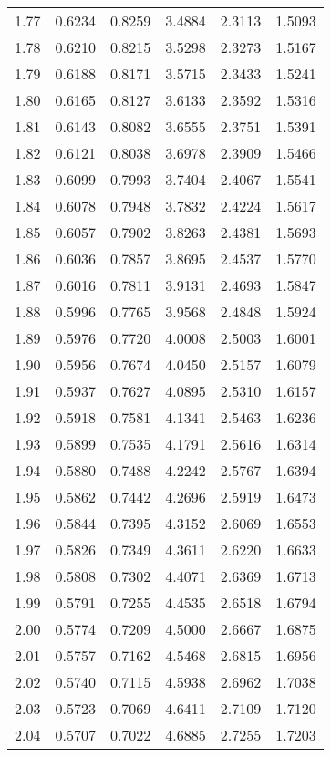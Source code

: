 \documentclass{article}
\begin{document}
\begin{longtable}{cccccc}
1.77 & 0.6234 & 0.8259 & 3.4884 & 2.3113 & 1.5093 \\
1.78 & 0.6210 & 0.8215 & 3.5298 & 2.3273 & 1.5167 \\
1.79 & 0.6188 & 0.8171 & 3.5715 & 2.3433 & 1.5241 \\
1.80 & 0.6165 & 0.8127 & 3.6133 & 2.3592 & 1.5316 \\
1.81 & 0.6143 & 0.8082 & 3.6555 & 2.3751 & 1.5391 \\
1.82 & 0.6121 & 0.8038 & 3.6978 & 2.3909 & 1.5466 \\
1.83 & 0.6099 & 0.7993 & 3.7404 & 2.4067 & 1.5541 \\
1.84 & 0.6078 & 0.7948 & 3.7832 & 2.4224 & 1.5617 \\
1.85 & 0.6057 & 0.7902 & 3.8263 & 2.4381 & 1.5693 \\
1.86 & 0.6036 & 0.7857 & 3.8695 & 2.4537 & 1.5770 \\
1.87 & 0.6016 & 0.7811 & 3.9131 & 2.4693 & 1.5847 \\
1.88 & 0.5996 & 0.7765 & 3.9568 & 2.4848 & 1.5924 \\
1.89 & 0.5976 & 0.7720 & 4.0008 & 2.5003 & 1.6001 \\
1.90 & 0.5956 & 0.7674 & 4.0450 & 2.5157 & 1.6079 \\
1.91 & 0.5937 & 0.7627 & 4.0895 & 2.5310 & 1.6157 \\
1.92 & 0.5918 & 0.7581 & 4.1341 & 2.5463 & 1.6236 \\
1.93 & 0.5899 & 0.7535 & 4.1791 & 2.5616 & 1.6314 \\
1.94 & 0.5880 & 0.7488 & 4.2242 & 2.5767 & 1.6394 \\
1.95 & 0.5862 & 0.7442 & 4.2696 & 2.5919 & 1.6473 \\
1.96 & 0.5844 & 0.7395 & 4.3152 & 2.6069 & 1.6553 \\
1.97 & 0.5826 & 0.7349 & 4.3611 & 2.6220 & 1.6633 \\
1.98 & 0.5808 & 0.7302 & 4.4071 & 2.6369 & 1.6713 \\
1.99 & 0.5791 & 0.7255 & 4.4535 & 2.6518 & 1.6794 \\
2.00 & 0.5774 & 0.7209 & 4.5000 & 2.6667 & 1.6875 \\
2.01 & 0.5757 & 0.7162 & 4.5468 & 2.6815 & 1.6956 \\
2.02 & 0.5740 & 0.7115 & 4.5938 & 2.6962 & 1.7038 \\
2.03 & 0.5723 & 0.7069 & 4.6411 & 2.7109 & 1.7120 \\
2.04 & 0.5707 & 0.7022 & 4.6885 & 2.7255 & 1.7203 \\

\end{longtable}
\end{document}
